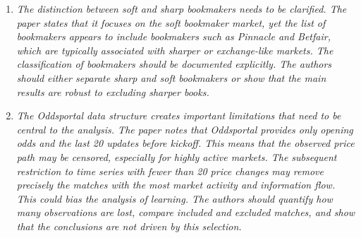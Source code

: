 \documentclass[letterpaper,12pt]{article}
\newcounter{b}
\newcommand{\Reply}[1]{\par\noindent\textbf{Reply:} #1}
\begin{document}
\begin{enumerate}
\Reply{We agree that our data cannot directly identify who trades or why, and that several alternative mechanisms -- bookmakers copying sharper competitors, internal risk-management rules, mechanical repricing algorithms, margin changes, or cross-bookmaker arbitrage -- could also generate the pattern that closing prices predict outcomes better than opening prices. We will revise the manuscript to consistently frame our results as evidence of \emph{price discovery} (an increase in informational content from open to close), rather than asserting a specific behavioral mechanism as established fact. Concretely, we will replace phrases such as ``the market identifies and corrects mispricing'' and ``rational bettors force bookmakers to adjust prices'' (pp.~15, 21--22) with more cautious language, e.g., ``prices become more informative from open to close, consistent with -- but not uniquely identifying -- informed betting activity'', and explicitly list the alternative mechanisms noted by the referee as competing explanations that our data cannot rule out. This same revision addresses the closely related concerns raised in Comment~9 below, by Referee~2 (Critical Comment~5), and by Referee~3 (Comment~4).}

\item \textit{The distinction between soft and sharp bookmakers needs to be clarified. The paper
states that it focuses on the soft bookmaker market, yet the list of bookmakers appears
to include bookmakers such as Pinnacle and Betfair, which are typically associated
with sharper or exchange-like markets. The classification of bookmakers should be
documented explicitly. The authors should either separate sharp and soft bookmakers
or show that the main results are robust to excluding sharper books. }

\item \textit{The Oddsportal data structure creates important limitations that need to be central
to the analysis. The paper notes that Oddsportal provides only opening odds and
the last 20 updates before kickoff. This means that the observed price path may be
censored, especially for highly active markets. The subsequent restriction to time series with fewer than 20 price changes may remove precisely the matches with the
most market activity and information flow. This could bias the analysis of learning.
The authors should quantify how many observations are lost, compare included and
excluded matches, and show that the conclusions are not driven by this selection.}


\end{enumerate}
\end{document}
